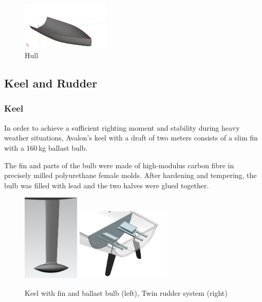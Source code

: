 \begin{figure}[htb]
\centering
\includegraphics[width=0.37\textwidth]{pics/hull.png}
\caption{Hull} \label{fig:hull}
\end{figure}

%
\subsection{Keel and Rudder}
\subsubsection{Keel}
In order to achieve a sufficient righting moment and stability
during heavy weather situations, {\sc Avalon}'s keel with a draft of
two meters consists of a slim fin with a 160\,kg ballast bulb.

The fin and parts of the bulb were made of high-modulus carbon fibre
in precisely milled polyurethane female molds. After hardening and
tempering, the bulb was filled with lead and the two halves were
glued together.

\begin{figure}[htb]
\centering
\includegraphics[width=2.7cm]{pics/keel.png}\hfill
\includegraphics[width=4.5cm]{pics/rudder.png}
\caption{Keel with fin and ballast bulb (left), Twin rudder system (right)} \label{fig:cadkeel}
\end{figure}

